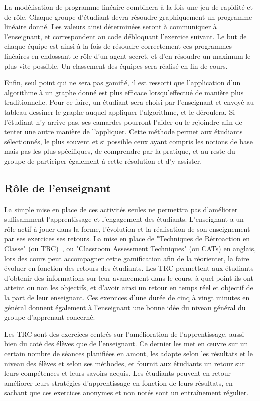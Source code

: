 La modélisation de programme linéaire combinera à la fois une jeu de rapidité et de rôle. Chaque groupe d'étudiant devra résoudre graphiquement un programme linéaire donné. Les valeurs ainsi déterminées seront à communiquer à l'enseignant, et correspondent au code débloquant l'exercice suivant. Le but de chaque équipe est ainsi à la fois de résoudre correctement ces programmes linéaires en endossant le rôle d'un agent secret, et d'en résoudre un maximum le plus vite possible. Un classement des équipes sera réalisé en fin de cours. \par
Enfin, seul point qui ne sera pas gamifié, il est ressorti que l'application d'un algorithme à un graphe donné est plus efficace lorsqu'effectué de manière plus traditionnelle. Pour ce faire, un étudiant sera choisi par l'enseignant et envoyé au tableau dessiner le graphe auquel appliquer l'algorithme, et le déroulera. Si l'étudiant n'y arrive pas, ses camardes pourront l'aider ou le rejoindre afin de tenter une autre manière de l'appliquer. Cette méthode permet aux étudiants sélectionnés, le plus souvent et si possible ceux ayant compris les notions de base mais pas les plus spécifiques, de comprendre par la pratique, et au reste du groupe de participer également à cette résolution et d'y assister.

\subsection{Rôle de l'enseignant}
La simple mise en place de ces activités seules ne permettra pas d'améliorer suffisamment l'apprentissage et l'engagement des étudiants. L'enseignant a un rôle actif à jouer dans la forme, l'évolution et la réalisation de son enseignement par ses exercices ses retours. La mise en place de "Techniques de Rétroaction en Classe" (ou TRC)~\cite{gamif-CATs}, ou "Classroom Assessment Techniques" (ou CATs) en anglais, lors des cours peut accompagner cette gamification afin de la réorienter, la faire évoluer en fonction des retours des étudiants. Les TRC permettent aux étudiants d'obtenir des informations sur leur avancement dans le cours, à quel point ils ont atteint ou non les objectifs, et d'avoir ainsi un retour en temps réel et objectif de la part de leur enseignant. Ces exercices d'une durée de cinq à vingt minutes en général donnent également à l'enseignant une bonne idée du niveau général du groupe d'apprenant concerné. \par

Les TRC sont des exercices centrés sur l'amélioration de l'apprentissage, aussi bien du coté des élèves que de l'enseignant. Ce dernier les met en œuvre sur un certain nombre de séances planifiées en amont, les adapte selon les résultats et le niveau des élèves et selon ses méthodes, et fournit aux étudiants un retour sur leurs compétences et leurs savoirs acquis. Les étudiants peuvent en retour améliorer leurs stratégies d'apprentissage en fonction de leurs résultats, en sachant que ces exercices anonymes et non notés sont un entraînement régulier. \par

